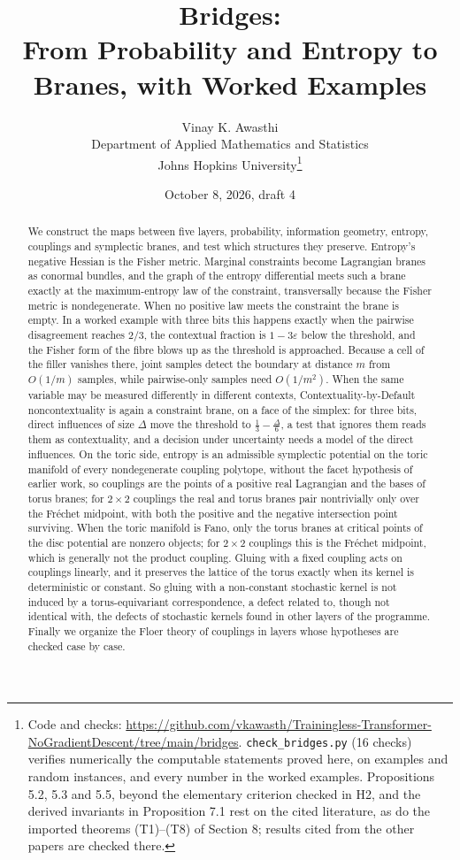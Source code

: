 \documentclass[11pt]{article}
\title{Bridges:\\ From Probability and Entropy to Branes, with Worked Examples}
\author{Vinay K. Awasthi\\
Department of Applied Mathematics and Statistics\\
Johns Hopkins University\thanks{Code and checks: \url{https://github.com/vkawasth/Trainingless-Transformer-NoGradientDescent/tree/main/bridges}. \texttt{check\_bridges.py} (16 checks) verifies numerically the computable statements proved here, on examples
and random instances, and every number in the worked examples. Propositions 5.2, 5.3 and 5.5, beyond the elementary criterion checked in H2, and the derived invariants in
Proposition 7.1 rest on the cited literature, as do the imported theorems (T1)--(T8) of Section 8; results cited from the other papers are checked there.}}
\date{October 8, 2026, draft 4}
\theoremstyle{definition}
\theoremstyle{remark}
\begin{document}
\maketitle

\begin{abstract}
We construct the maps between five layers, probability, information geometry, entropy, couplings and symplectic branes,
and test which structures they preserve. Entropy's negative Hessian is the Fisher metric. Marginal constraints become
Lagrangian branes as conormal bundles, and the graph of the entropy differential meets such a brane exactly at the
maximum-entropy law of the constraint, transversally because the Fisher metric is nondegenerate. When no positive law meets
the constraint the brane is empty. In a worked example with three bits this happens exactly when the pairwise disagreement
reaches $2/3$, the contextual fraction is $1-3\varepsilon$ below the threshold, and the Fisher form of the fibre blows up as
the threshold is approached. Because a cell of the filler vanishes there, joint samples detect the boundary at distance $m$
from $O(1/m)$ samples, while pairwise-only samples need $O(1/m^2)$. When the same variable may be measured differently in
different contexts, Contextuality-by-Default noncontextuality is again a constraint brane, on a face of the simplex: for three bits, direct
influences of size $\Delta$ move the threshold to $\frac13-\frac{\Delta}6$, a test that ignores them reads them as contextuality, and a
decision under uncertainty needs a model of the direct influences. On the toric side,
entropy is an admissible symplectic potential on the toric manifold of every nondegenerate coupling polytope, without the
facet hypothesis of earlier work, so couplings are the points of a positive real Lagrangian and the bases of torus branes; for $2\times2$ couplings the real and torus
branes pair nontrivially only over the Fréchet midpoint, with both the positive and the negative intersection point surviving. When the
toric manifold is Fano, only the torus branes at critical points of the disc potential are nonzero objects; for $2\times2$
couplings this is the Fréchet midpoint, which is generally not the product coupling. Gluing with a fixed coupling acts on couplings linearly, and it preserves the lattice of the
torus exactly when its kernel is deterministic or constant. So gluing with a non-constant stochastic kernel is not induced by a
torus-equivariant correspondence, a defect related to, though not identical with, the defects of stochastic kernels found in
other layers of the programme. Finally we organize the Floer theory of couplings in layers whose hypotheses are checked case by case.

\end{abstract}
\end{document}
